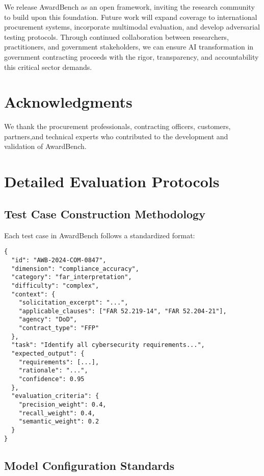 \documentclass[11pt,a4paper]{article}
\begin{document}
We release AwardBench as an open framework, inviting the research community to build upon this foundation. Future work will expand coverage to international procurement systems, incorporate multimodal evaluation, and develop adversarial testing protocols. Through continued collaboration between researchers, practitioners, and government stakeholders, we can ensure AI transformation in government contracting proceeds with the rigor, transparency, and accountability this critical sector demands.

\section*{Acknowledgments}

We thank the procurement professionals, contracting officers, customers, partners,and technical experts who contributed to the development and validation of AwardBench.




\appendix

\section{Detailed Evaluation Protocols}
\label{app:protocols}

\subsection{Test Case Construction Methodology}

Each test case in AwardBench follows a standardized format:

\begin{lstlisting}[basicstyle=\small]
{
  "id": "AWB-2024-COM-0847",
  "dimension": "compliance_accuracy",
  "category": "far_interpretation",
  "difficulty": "complex",
  "context": {
    "solicitation_excerpt": "...",
    "applicable_clauses": ["FAR 52.219-14", "FAR 52.204-21"],
    "agency": "DoD",
    "contract_type": "FFP"
  },
  "task": "Identify all cybersecurity requirements...",
  "expected_output": {
    "requirements": [...],
    "rationale": "...",
    "confidence": 0.95
  },
  "evaluation_criteria": {
    "precision_weight": 0.4,
    "recall_weight": 0.4,
    "semantic_weight": 0.2
  }
}
\end{lstlisting}

\subsection{Model Configuration Standards}
\end{document}
